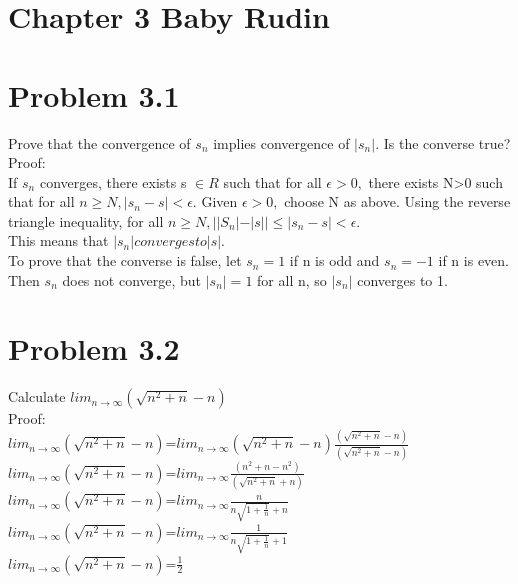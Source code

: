 \newpage 
\section{Chapter 3 Baby Rudin}

\section*{Problem 3.1}
Prove that the convergence of ${s_n}$ implies convergence of $|{s_n|}.$ Is the converse true? 
\\
Proof:\\ 
If ${s_n}$ converges, there exists s $\in R$ such that for all $\epsilon>0,$ there exists N>0 such that for all $n \geq N, |s_n -s|< \epsilon.$ Given $ \epsilon>0,$ choose N as above. Using the reverse triangle inequality, for all $n \geq N, ||S_n|-|s||\leq |s_n -s|< \epsilon.$ \\ 
This means that ${|s_n|} converges to |s|.$\\ 
To prove that the converse is false, let $s_n=1$ if n is odd and $s_n=-1$ if n is even. Then ${s_n}$ does not converge, but $|s_n|=1$ for all n, so ${|s_n}|$ converges to 1.\\ 

\section*{Problem 3.2}
Calculate $lim_{n \rightarrow \infty} (\sqrt{n^2+n}-n)$\\ 
Proof: \\ 
$lim_{n \rightarrow \infty} (\sqrt{n^2+n}-n)$=$lim_{n \rightarrow \infty} (\sqrt{n^2+n}-n) \frac{(\sqrt{n^2+n}-n)}{(\sqrt{n^2+n}-n)}$\\ 
$lim_{n \rightarrow \infty} (\sqrt{n^2+n}-n)$=$lim_{n \rightarrow \infty}  \frac{(n^2+n-n^2)}{(\sqrt{n^2+n}+n)}$\\
$lim_{n \rightarrow \infty} (\sqrt{n^2+n}-n)$=$lim_{n \rightarrow \infty}  \frac{n}{n\sqrt{1+\frac{1}{n}}+n}$\\
$lim_{n \rightarrow \infty} (\sqrt{n^2+n}-n)$=$lim_{n \rightarrow \infty}  \frac{1}{n\sqrt{1+\frac{1}{n}}+1}$\\
$lim_{n \rightarrow \infty} (\sqrt{n^2+n}-n)$=$\frac{1}{2}$\\
